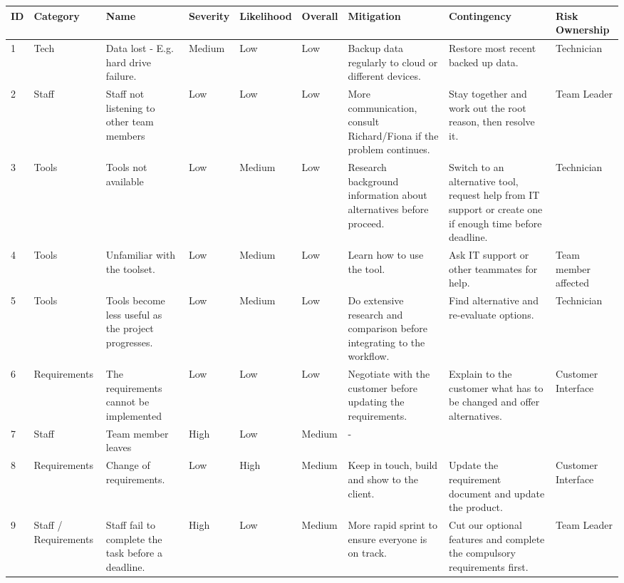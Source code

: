 \newcommand{\low}{\cellcolor{green}Low}
\newcommand{\medium}{\cellcolor{orange}Medium}
\newcommand{\high}{\cellcolor{red}High}
\begin{longtable}{|l|p{2cm}|p{3cm}|l|l|l|p{4cm}|p{4cm}|p{3cm}|}
	\hline
	\textbf{ID} & \textbf{Category} & \textbf{Name} & \textbf{Severity} & \textbf{Likelihood} & \textbf{Overall} & \textbf{Mitigation} & \textbf{Contingency} & \textbf{Risk Ownership} \\ \hline \hline
	\endhead
	1 & Tech & Data lost - E.g. hard drive failure. & Medium & Low & \low & Backup data regularly to cloud or different devices. & Restore most recent backed up data. & Technician \\ \hline
	2 & Staff & Staff not listening to other team members & Low & Low & \low & More communication, consult Richard/Fiona if the problem continues. & Stay together and work out the root reason, then resolve it. & Team Leader \\ \hline
	3 & Tools & Tools not available & Low & Medium & \low & Research background information about alternatives before proceed. & Switch to an alternative tool, request help from IT support or create one if enough time before deadline. & Technician \\ \hline
	4 & Tools & Unfamiliar with the toolset. & Low & Medium & \low & Learn how to use the tool. & Ask IT support or other teammates for help. & Team member affected \\ \hline
	5 & Tools & Tools become less useful as the project progresses. & Low & Medium & \low & Do extensive research and comparison before integrating to the workflow. & Find alternative and re-evaluate options. & Technician \\ \hline
	6 & Requirements & The requirements cannot be implemented & Low & Low & \low & Negotiate with the customer before updating the requirements. & Explain to the customer what has to be changed and offer alternatives. & Customer Interface \\ \hline
	7 & Staff & Team member leaves & High & Low & \medium & - &  &  \\ \hline
	8 & Requirements & Change of requirements. & Low & High & \medium & Keep in touch, build and show to the client. & Update the requirement document and update the product. & Customer Interface \\ \hline
	9 & Staff / Requirements & Staff fail to complete the task before a deadline. & High & Low & \medium & More rapid sprint to ensure everyone is on track. & Cut our optional features and complete the compulsory requirements first. & Team Leader \\ \hline

\end{longtable}
